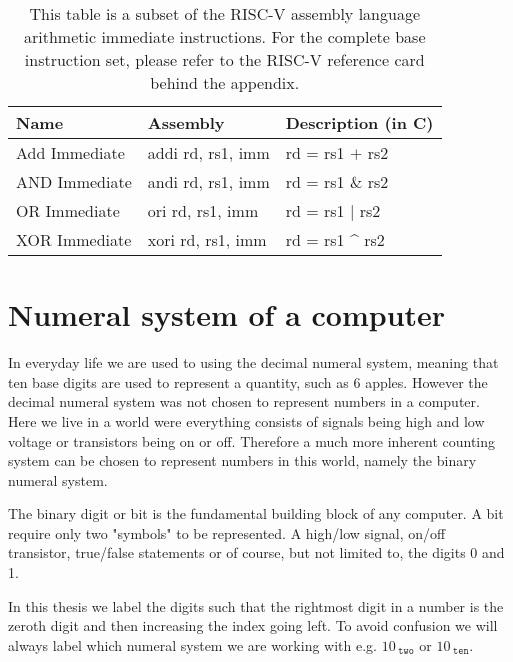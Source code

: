     \begin{table}[h!]
        \centering
        \begin{tabular}{|l|l|l|}
        	\hline
        	Name          & Assembly          & Description (in C) \\ \hline
        	Add Immediate & addi rd, rs1, imm & rd = rs1 $+$ rs2   \\
        	AND Immediate & andi rd, rs1, imm & rd = rs1 \& rs2    \\
        	OR Immediate  & ori rd, rs1, imm  & rd = rs1 $|$ rs2   \\
        	XOR Immediate & xori rd, rs1, imm & rd = rs1 \^{} rs2  \\ \hline
        \end{tabular}
        \caption{This table is a subset of the RISC-V assembly language arithmetic immediate instructions. For the complete base instruction set, please refer to the RISC-V reference card behind the appendix.}
        \label{table:RISCVImmediateInstructions}
    \end{table}
        
\section{Numeral system of a computer}
    In everyday life we are used to using the decimal numeral system, meaning that ten base digits are used to represent a quantity, such as 6 apples. However the decimal numeral system was not chosen to represent numbers in a computer. Here we live in a world were everything consists of signals being high and low voltage or transistors being on or off. Therefore a much more inherent counting system can be chosen to represent numbers in this world, namely the binary numeral system.
    
    The binary digit or bit is the fundamental building block of any computer. A bit require only two "symbols" to be represented. A high/low signal, on/off transistor, true/false statements or of course, but not limited to, the digits 0 and 1.
    
    In this thesis we label the digits such that the rightmost digit in a number is the zeroth digit and then increasing the index going left. To avoid confusion we will always label which numeral system we are working with e.g. $10_{\;\texttt{two}}$ or $10_{\;\texttt{ten}}$.
    
